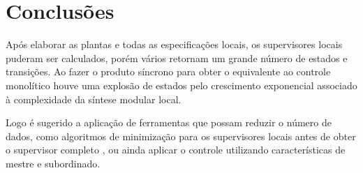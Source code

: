 \section{Conclusões}
Após elaborar as plantas e todas as especificações locais, os supervisores locais puderam ser calculados, porém vários retornam um grande número de estados e transições. Ao fazer o produto síncrono para obter o equivalente ao controle monolítico houve uma explosão de estados pelo crescimento exponencial associado à complexidade da síntese modular local.

Logo é sugerido a aplicação de ferramentas que possam reduzir o número de dados, como algoritmos de minimização para os supervisores locais antes de obter o supervisor completo \cite{Queiroz}, ou ainda aplicar o controle utilizando características de mestre e subordinado.